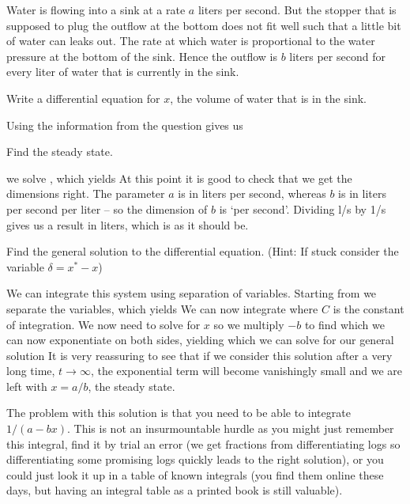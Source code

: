 Water is flowing into a sink at a rate $a$ liters per second. But the stopper that is supposed to plug the outflow at the bottom does not fit well such that a little bit of water can leaks out. The rate at which water is proportional to the water pressure at the bottom of the sink. Hence the outflow is $b$ liters per second for every liter of water that is currently in the sink. 

\subquestion Write a differential equation for $x$, the volume of water that is in the sink. 

\solution
Using the information from the question gives us 

\subquestion Find the steady state.

\solution
we solve 
,
which yields 
At this point it is good to check that we get the dimensions right. The parameter $a$ is in liters per second, whereas $b$ is in liters per second per liter -- so the dimension of $b$ is `per second'. Dividing l/s by 1/s gives us a result in liters, which is as it should be.   

\subquestion Find the general solution to the differential equation. (Hint: If stuck consider the variable $\delta=x^*-x$)

\solution
We can integrate this system using separation of variables. Starting from 
we separate the variables, which yields 
We can now integrate
where $C$ is the constant of integration. We now need to solve for $x$ so we multiply $-b$ to find
which we can now exponentiate on both sides, yielding
which we can solve for our general solution
It is very reassuring to see that if we consider this solution after a very long time, $t\to \infty$, the exponential term will become vanishingly small and we are left with $x=a/b$, the steady state. 

The problem with this solution is that you need to be able to integrate $1/(a-bx)$. This is not an insurmountable hurdle as you might just remember this integral, find it by trial an error (we get fractions from differentiating logs so differentiating some promising logs quickly leads to the right solution), or you could just look it up in a table of known integrals (you find them online these days, but having an integral table as a printed book is still valuable). 

